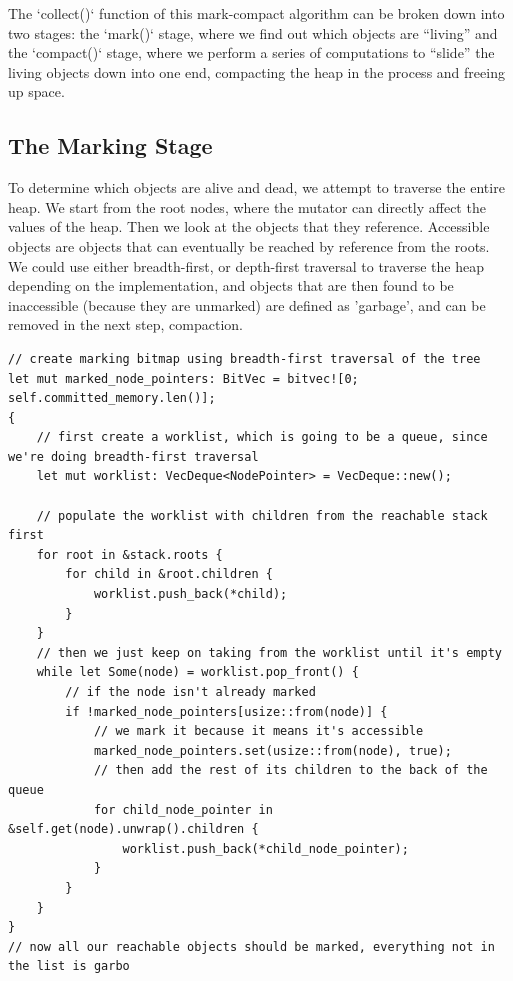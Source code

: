\documentclass[index]{subfiles}
\begin{document}
The `collect()` function of this mark-compact algorithm can be broken down into two stages: the `mark()` stage, where we find out which objects are ``living'' and the `compact()` stage, where we perform a series of computations to ``slide'' the living objects down into one end, compacting the heap in the process and freeing up space.

\subsection{The Marking Stage}

To determine which objects are alive and dead, we attempt to traverse the entire heap. We start from the root nodes, where the mutator can directly affect the values of the heap. Then we look at the objects that they reference. Accessible objects are objects that can eventually be reached by reference from the roots. We could use either breadth-first, or depth-first traversal to traverse the heap depending on the implementation, and  objects that are then found to be inaccessible (because they are unmarked) are defined as 'garbage', and can be removed in the next step, compaction.


\begin{verbatim}
// create marking bitmap using breadth-first traversal of the tree
let mut marked_node_pointers: BitVec = bitvec![0; self.committed_memory.len()];
{
    // first create a worklist, which is going to be a queue, since we're doing breadth-first traversal
    let mut worklist: VecDeque<NodePointer> = VecDeque::new();

    // populate the worklist with children from the reachable stack first
    for root in &stack.roots {
        for child in &root.children {
            worklist.push_back(*child);
        }
    }
    // then we just keep on taking from the worklist until it's empty
    while let Some(node) = worklist.pop_front() {
        // if the node isn't already marked
        if !marked_node_pointers[usize::from(node)] {
            // we mark it because it means it's accessible
            marked_node_pointers.set(usize::from(node), true);
            // then add the rest of its children to the back of the queue
            for child_node_pointer in &self.get(node).unwrap().children {
                worklist.push_back(*child_node_pointer);
            }
        }
    }
}
// now all our reachable objects should be marked, everything not in the list is garbo
\end{verbatim}
\end{document}
